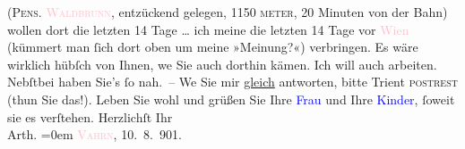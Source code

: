                   (\textsc{Pens. \textcolor{pink}{Waldbrunn}{}\ledrightnote{\textcolor{pink}{Wildbad Waldbrunn}}}, entzückend gelegen, 1150 \textsc{meter}, 20 Minuten von der
               Bahn) wollen dort die letzten 14 Tage {\dots} ich mei{\pb}ne die letzten 14 Tage vor \textcolor{pink}{Wien}{}\ledrightnote{\textcolor{pink}{Wien}} (kümmert man ſich dort oben um meine »Meinung?«) verbringen. Es wäre
               wirklich hübſch von Ihnen, we{\geminationn} Sie auch dorthin kämen.
               Ich will auch arbeiten. Nebſtbei haben Sie’s ſo nah. – \pend
           \pstart
           We{\geminationn} Sie mir \uline{gleich}
               antworten, bitte Trient \textsc{postrest} (thun Sie das!).\pend
           \pstart
           {\pb}Leben Sie wohl und grüßen Sie Ihre \textcolor{blue}{Frau}{} und Ihre
               \textcolor{blue}{Kinder}{}, ſoweit sie es verſtehen.\pend
           \pstart
           Herzlichſt Ihr{\\[\baselineskip]}\spacefill\mbox{Arth.}\pend
           \leftskip=0em{}\pstart
           \textcolor{pink}{\textsc{Vahrn}}{}\ledrightnote{\textcolor{pink}{Vahrn}}, 10. 8. 901.\pend
           \endnumbering{}  
      